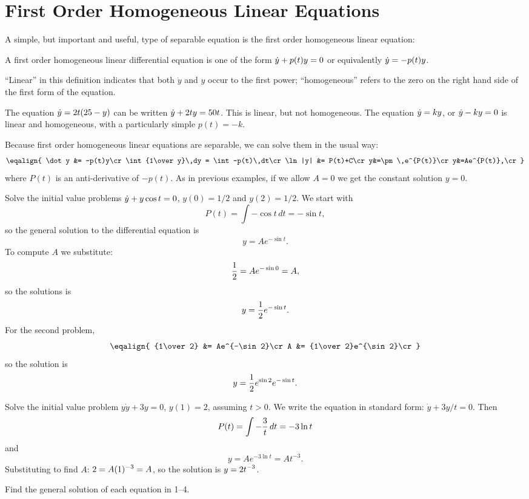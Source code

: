 \section{First Order Homogeneous Linear Equations}{}{}
\nobreak
A simple, but important and useful, type of separable equation is the
{\dfont first order homogeneous linear equation\/}:

 A first order homogeneous linear differential equation
is one of
the form $\displaystyle \dot y + p(t)y=0$
or equivalently
$\displaystyle \dot y = -p(t)y$.
\enddef

``Linear'' in this definition indicates that both $\dot y$ and $y$
occur to the first power; ``homogeneous'' refers to the zero on the
right hand side of the first form of the equation.

\example The equation $\displaystyle \dot y = 2t(25-y)$ can be written
$\displaystyle \dot y + 2ty= 50t$. This is linear, but not homogeneous. The
equation $\displaystyle \dot y=ky$, or $\displaystyle \dot y-ky=0$ is linear and
homogeneous, with a particularly simple $p(t)=-k$.
\endexample

Because first order homogeneous linear equations are separable, we can
solve them in the usual way:
$$\eqalign{
\dot y &= -p(t)y\cr
\int {1\over y}\,dy = \int -p(t)\,dt\cr
\ln|y| &= P(t)+C\cr
y&=\pm\,e^{P(t)}\cr
y&=Ae^{P(t)},\cr}
$$
where $P(t)$ is an anti-derivative of $-p(t)$. As in previous
examples, if we allow $A=0$ we get the constant solution $y=0$.

\example Solve the initial value problems $\displaystyle \dot y + y\cos t =0$,
$y(0)=1/2$ and $y(2)=1/2$. We start with
$$P(t)=\int -\cos t\,dt = -\sin t,$$
so the general solution to the differential equation is
$$y=Ae^{-\sin t}.$$
To compute $A$ we substitute:
$$ {1\over 2} = Ae^{-\sin 0} = A,$$
so the solutions is 
$$ y = {1\over 2} e^{-\sin t}.$$
For the second problem,
$$ \eqalign{
{1\over 2} &= Ae^{-\sin 2}\cr
A &= {1\over 2}e^{\sin 2}\cr}
$$
so the solution is 
$$ y = {1\over 2}e^{\sin 2}e^{-\sin t}.$$
\vskip-15pt\endexample

\example Solve the initial value problem $y\dot y+3y=0$, $y(1)=2$,
assuming $t>0$. We
write the equation in standard form: $\dot y+3y/t=0$. Then
$$P(t)=\int -{3\over t}\,dt=-3\ln t$$
and 
$$ y=Ae^{-3\ln t}=At^{-3}.$$
Substituting to find $A$:
$\displaystyle 2=A(1)^{-3}=A$, so the solution is $\displaystyle y=2t^{-3}$.
\endexample

\exercises

Find the general solution of each equation in 1--4.

